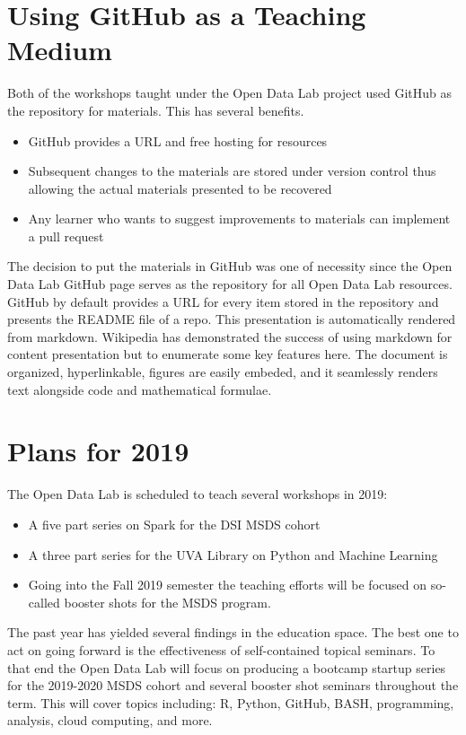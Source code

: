 \section{Using GitHub as a Teaching Medium}
\label{githubforteaching}
Both of the workshops taught under the Open Data Lab project used GitHub as the repository for materials. This has several benefits.
\begin{itemize}
\item GitHub provides a URL and free hosting for resources
\item Subsequent changes to the materials are stored under version control thus allowing the actual materials presented to be recovered
\item Any learner who wants to suggest improvements to materials can implement a pull request
\end{itemize}

The decision to put the materials in GitHub was one of necessity since the Open Data Lab GitHub page serves as the repository for all Open Data Lab resources. GitHub by default provides a URL for every item stored in the repository and presents the README file of a repo. This presentation is automatically rendered from markdown. Wikipedia has demonstrated the success of using markdown for content presentation but to enumerate some key features here. The document is organized, hyperlinkable, figures are easily embeded, and it seamlessly renders text alongside code and mathematical formulae.

\section{Plans for 2019}
The Open Data Lab is scheduled to teach several workshops in 2019:
\begin{itemize}
\item A five part series on Spark for the DSI MSDS cohort
\item A three part series for the UVA Library on Python and Machine Learning
\item Going into the Fall 2019 semester the teaching efforts will be focused on so-called booster shots for the MSDS program.
\end{itemize}

The past year has yielded several findings in the education space. The best one to act on going forward is the effectiveness of self-contained topical seminars. To that end the Open Data Lab will focus on producing a bootcamp startup series for the 2019-2020 MSDS cohort and several booster shot seminars throughout the  term. This will cover topics including: R, Python, GitHub, BASH, programming, analysis, cloud computing, and more.